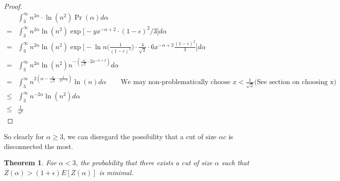\documentclass{article}
\newtheorem{theorem}{Theorem}
\begin{document}
\begin{proof}
\begin{align*}
&\int_{3}^\infty n^{2\alpha}\cdot \ln{(n^2)} \Pr(\alpha) d\alpha \\
= &\int_{3}^\infty n^{2\alpha} \ln{(n^2)} \exp \bigg[-y x^{-\alpha + 2} \cdot (1-\epsilon)^2/3 \bigg] d\alpha \\
= &\int_{3}^\infty n^{2\alpha} \ln{(n^2)} \exp \bigg[-\ln{n}\bigg(\frac{1}{(1-\epsilon)^2}\bigg) \cdot \frac{4}{\sqrt{2}} \cdot 6x^{-\alpha + 2} \frac{(1-\epsilon)^2}{3} \bigg] d\alpha \\
= &\int_{3}^\infty n^{2\alpha} \ln{(n^2)} n^{-(\frac{4}{\sqrt{2}} \cdot 2x^{-\alpha + 2})} d\alpha \\
= &\int_{3}^\infty n^{2 (\alpha - \frac{4}{\sqrt{2}} \cdot \frac{1}{x^{\alpha-2}})} \ln{(n)}  d\alpha \hspace{25pt} \text{We may non-problematically choose } x < \frac{1}{\sqrt{2}} \text{(See section on choosing x)}\\
\leq &\int_{3}^\infty n^{-2\alpha} \ln{(n^2)} d\alpha \\
\leq &\frac{1}{n^6}
\end{align*}
\end{proof}

So clearly for $\alpha \geq 3$, we can disregard the possibility that a cut of size $\alpha c$ is disconnected the most.

\begin{theorem}
For $\alpha < 3$, the probability that there exists a cut of size $\alpha$  such that $Z(\alpha) > (1+\epsilon) E[Z(\alpha)]$ is minimal. 
\end{theorem}
\end{document}

